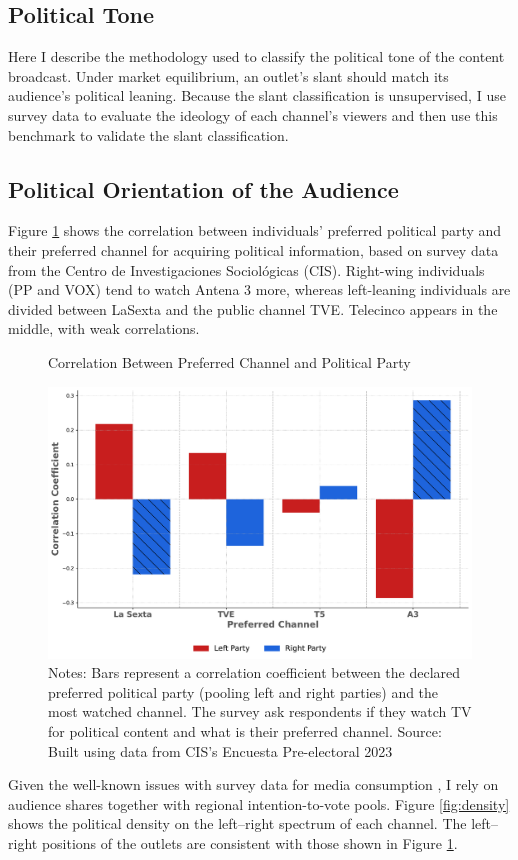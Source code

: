 \documentclass[12pt]{article}
\begin{document}
	
	\subsection{Political Tone}
	
	\label{sec:classification}
	
	Here I describe the methodology used to classify the political tone of the content broadcast. Under market equilibrium, an outlet's slant should match its audience's political leaning. Because the slant classification is unsupervised, I use survey data to evaluate the ideology of each channel's viewers and then use this benchmark to validate the slant classification.
	
	\subsection*{Political Orientation of the Audience}
	
	Figure \ref{fig:opinion} shows the correlation between individuals' preferred political party and their preferred channel for acquiring political information, based on survey data from the Centro de Investigaciones Sociológicas (CIS). Right-wing individuals (PP and VOX) tend to watch Antena 3 more, whereas left-leaning individuals are divided between LaSexta and the public channel TVE. Telecinco appears in the middle, with weak correlations.
	
	
	\begin{figure}[h!]
		\centering
		\caption{Correlation Between Preferred Channel and Political Party}
		\includegraphics[width=120mm]{figures/corr_party_channel3}
		\caption*{\small Notes:  Bars represent a correlation coefficient between the declared preferred political party (pooling left and right parties) and the most watched channel. The survey ask respondents if they watch TV for political content and what is their preferred channel. Source: Built using data from CIS's Encuesta Pre-electoral 2023 }
		\label{fig:opinion}
	\end{figure}
	Given the well-known issues with survey data for media consumption \citep{prior}, I rely on audience shares together with regional intention-to-vote pools. Figure \ref{fig:density} shows the political density on the left–right spectrum of each channel. The left–right positions of the outlets are consistent with those shown in Figure \ref{fig:opinion}. 
	
\end{document}
